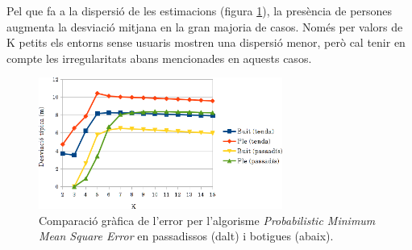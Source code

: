 Pel que fa a la dispersió de les estimacions (figura \ref{fig:grafic_desviacio_MMSE}), la presència de persones augmenta la desviació mitjana en la gran majoria de casos. Només per valors de K petits els entorns sense usuaris mostren una dispersió menor, però cal tenir en compte les irregularitats abans mencionades en aquests casos. 

\begin{figure}[ht]
\begin{center}
\includegraphics[width=8cm]{imatges/mmse_desviacio.png}
\caption{Comparació gràfica de l'error per l'algorisme \textit{Probabilistic Minimum Mean Square Error} en passadissos (dalt) i botigues (abaix).}
\label{fig:grafic_desviacio_MMSE}
\end{center}
\end{figure}
